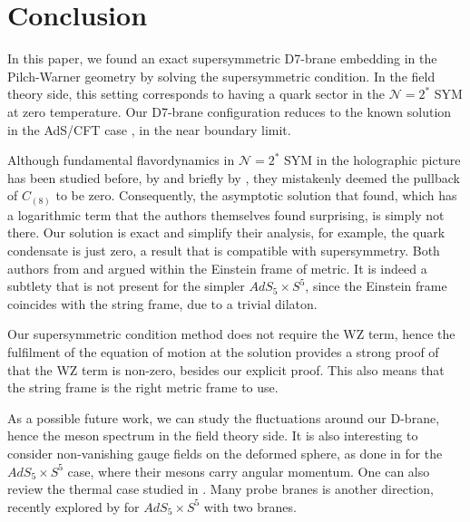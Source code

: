 \section{Conclusion}

In this paper, we found an exact supersymmetric D7-brane embedding in the Pilch-Warner geometry by solving the supersymmetric condition. In the field theory side, this setting corresponds to having a quark sector in the $\mathcal{N}=2^*$ SYM at zero temperature. Our D7-brane configuration reduces to the known solution in the AdS/CFT case \cite{Karch:2005ms}, in the near boundary limit. 

Although fundamental flavordynamics in $\mathcal{N}=2^*$ SYM in the holographic picture has been studied before, by \cite{Albash:2011nw} and briefly by \cite{Evans:2005ti}, they mistakenly deemed the pullback of $C_{(8)}$ to be zero. Consequently, the asymptotic solution that \cite{Albash:2011nw} found, which has a logarithmic term that the authors themselves found surprising, is simply not there. Our solution is exact and simplify their analysis, for example, the quark condensate is just zero, a result that is compatible with supersymmetry. Both authors from \cite{Albash:2011nw} and \cite{Evans:2005ti} argued within the Einstein frame of metric. It is indeed a subtlety that is not present for the simpler $AdS_5 \times S^5$, since the Einstein frame coincides with the string frame, due to a trivial dilaton. 

Our supersymmetric condition method does not require the WZ term, hence the fulfilment of the equation of motion at the solution provides a strong proof of that the WZ term is non-zero, besides our explicit proof. This also means that the string frame is the right metric frame to use. 

As a possible future work, we can study the fluctuations around our D-brane, hence the meson spectrum in the field theory side. 
It is also interesting to consider non-vanishing gauge fields on the deformed sphere, as done in \cite{Kruczenski:2003be} for the $AdS_5 \times S^5$ case, where their mesons carry angular momentum. One can also review the thermal case studied in \cite{Albash:2011dq}. Many probe branes is another direction, recently explored by \cite{Faedo:2019jlp} for $AdS_5 \times S^5$ with two branes.


